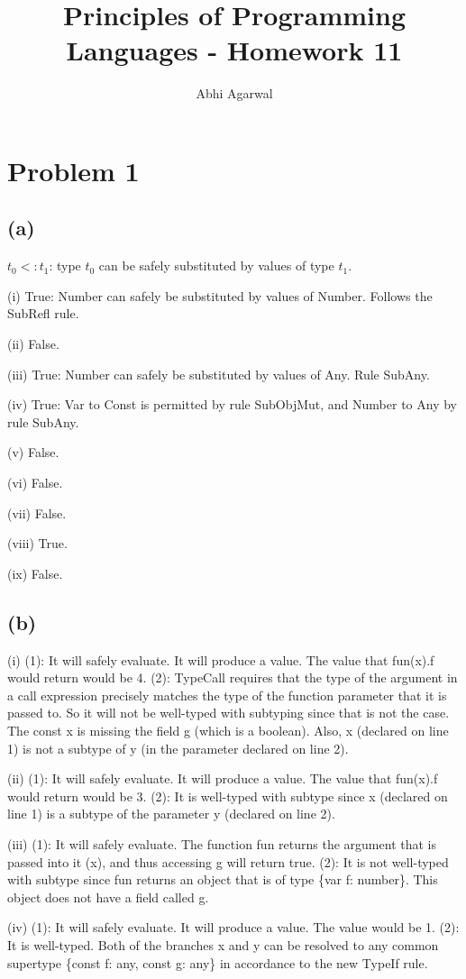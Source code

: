 \documentclass[11pt, oneside]{article}
\title{Principles of Programming Languages - Homework 11}
\author{Abhi Agarwal}
\date{}
\begin{document}
\maketitle
\section{Problem 1}
\subsection*{(a)} 

\indent \par $t_0 <: t_1$: type $t_0$ can be safely substituted by values of type $t_1$.
\par (i) True: Number can safely be substituted by values of Number. Follows the SubRefl rule.
\par (ii) False.
\par (iii) True: Number can safely be substituted by values of Any. Rule SubAny.
\par (iv) True: Var to Const is permitted by rule SubObjMut, and Number to Any by rule SubAny.
\par (v) False.
\par (vi) False.
\par (vii) False.
\par (viii) True.
\par (ix) False.

\subsection*{(b)} 
\indent \par (i) (1): It will safely evaluate. It will produce a value. The value that fun(x).f would return would be 4. (2): TypeCall requires that the type of the argument in a call expression precisely matches the type of the function parameter that it is passed to. So it will not be well-typed with subtyping since that is not the case. The const x is missing the field g (which is a boolean). Also, x (declared on line 1) is not a subtype of y (in the parameter declared on line 2).
\par (ii) (1): It will safely evaluate. It will produce a value. The value that fun(x).f would return would be 3. (2): It is well-typed with subtype since x (declared on line 1) is a subtype of the parameter y (declared on line 2).
\par (iii) (1): It will safely evaluate. The function fun returns the argument that is passed into it (x), and thus accessing g will return true. (2): It is not well-typed with subtype since fun returns an object that is of type \{var f: number\}. This object does not have a field called g.
\par (iv) (1): It will safely evaluate. It will produce a value. The value would be 1. (2):	It is well-typed. Both of the branches x and y can be resolved to any common supertype \{const f: any, const g: any\} in accordance to the new TypeIf rule.
\end{document}
